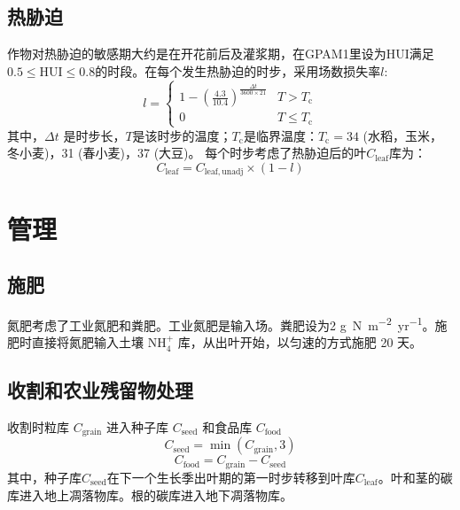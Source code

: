 \subsection{热胁迫}
作物对热胁迫的敏感期大约是在开花前后及灌浆期，在GPAM1里设为${\mathrm {HUI}} $满足$0.5 \leqslant {\mathrm {HUI}} \leqslant 0.8$的时段。在每个发生热胁迫的时步，采用场数损失率$l$:
\begin{equation}
  l=\left\{\begin{array}{cc}1-\left(\frac{4.3}{10.4}\right)^{\frac{\Delta t}{3600\times 21}} & T>T_{\mathrm{c}} \\ 0 & T \leqslant T_{\mathrm{c}}\end{array}\right.
\end{equation}
其中，$\Delta t$ 是时步长，$T$是该时步的温度；$T_{\mathrm {c}} $是临界温度：$T_{\mathrm {c}} =34$ \textcelsius (水稻，玉米，冬小麦)，31 \textcelsius (春小麦)，37 \textcelsius (大豆)。
每个时步考虑了热胁迫后的叶$C_{\mathrm{leaf}}$库为：
\begin{equation}
  C_{\mathrm{leaf}}=C_{\mathrm{leaf,  {unadj}}} \times (1-l)
\end{equation}


\section{管理}
\subsection{施肥}
氮肥考虑了工业氮肥和粪肥。工业氮肥是输入场。粪肥设为2 \unit{g.N.m^{−2}.yr^{−1}}。施肥时直接将氮肥输入土壤 $\mathrm{NH_4^+}$ 库，从出叶开始，以匀速的方式施肥 20 天。

\subsection{收割和农业残留物处理}
收割时粒库 $C_{\mathrm{grain}}$ 进入种子库 $C_{\mathrm{seed}}$ 和食品库 $C_{\mathrm{food}}$
\begin{equation}
  C_{\mathrm{seed}}=\min \left(C_{\mathrm{grain}}, 3\right)
\end{equation}
\begin{equation}
  C_{\mathrm{food}}=C_{\mathrm{grain}}-C_{\mathrm{seed}}
\end{equation}
其中，种子库$C_{\mathrm{seed}}$在下一个生长季出叶期的第一时步转移到叶库$C_{\mathrm{leaf}}$。叶和茎的碳库进入地上凋落物库。根的碳库进入地下凋落物库。

